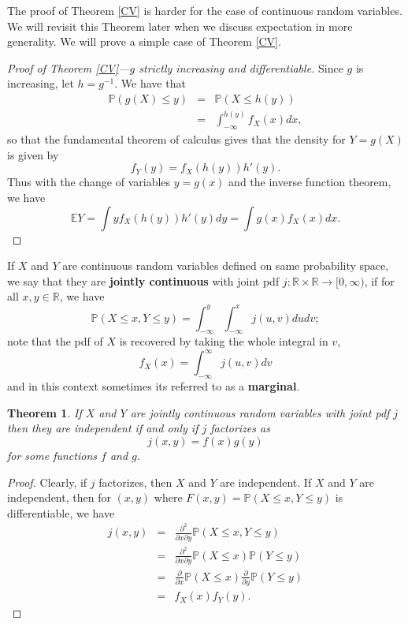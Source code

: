 \documentclass[12pt, reqno]{amsart}
\newtheorem{theorem}{Theorem}
\newcommand\dff[1]{\textbf{#1}}
\renewcommand{\P}{{\mathbb P}}  %
\newcommand{\R}{{\mathbb R}}
\newcommand{\E}{{\mathbb E}}     %
\begin{document}
The proof of Theorem \ref{CV} is harder for the case of continuous random variables.   We will revisit this Theorem later when we discuss expectation in more generality.   We will prove a simple case of Theorem \ref{CV}.

\begin{proof}[Proof of Theorem \ref{CV}---$g$ strictly increasing and differentiable]
Since $g$ is increasing, let $h = g^{-1}$. We have that 
\begin{eqnarray*}
 \P( g(X) \leq y)  &=&  \P( X \leq h(y)) \\
 &=&  \int_{- \infty} ^{h(y)} f_X(x) dx,
\end{eqnarray*}
so that the fundamental theorem of calculus gives that the density for $Y = g(X)$ is given by
$$f_Y(y) = f_X(h(y)) h'(y).$$  Thus with the change of variables $y = g(x)$ and the inverse function theorem, we have 
$$ \E Y = \int y f_X(h(y)) h'(y) dy = \int g(x) f_X(x) dx.$$
\end{proof}


If $X$ and $Y$ are continuous  random variables defined on same probability space, we say that they are \dff{jointly continuous} with joint pdf $j:\R \times \R \to [0, \infty)$, if for all $x,y \in \R$, we have
$$ \P(X \leq x , Y \leq y) = \int_{-\infty} ^y \int_{-\infty} ^x j(u,v) du dv;$$
note that the pdf of $X$ is recovered by taking the whole integral in $v$,
$$f_X(x) =   \int_{-\infty} ^{\infty}  j(u,v) dv$$
and in this context sometimes its referred to as a \dff{marginal}.

\begin{theorem}     If $X$ and $Y$ are jointly continuous random variables with joint pdf $j$ then they are independent if and only if $j$ factorizes as
$$j(x,y) =f(x)g(y)$$
for some functions $f$ and $g$.  

\end{theorem}

\begin{proof}
Clearly, if $j$ factorizes, then $X$ and $Y$ are independent.  If $X$ and $Y$ are independent, then for $(x,y)$ where  $F(x,y) = \P(X \leq x, Y\leq y)$ is differentiable, we have
\begin{eqnarray*}
j(x,y) &=&  \frac{\partial^2}{ \partial x \partial y} \P(X \leq x, Y \leq y) \\
&=& \frac{\partial^2}{ \partial x \partial y} \P(X \leq x) \P( Y \leq y) \\
&=& \frac{ \partial }{\partial x} \P(X \leq x) \frac{\partial }{\partial y} \P( Y \leq y) \\
&=& f_X(x) f_Y(y).
\end{eqnarray*}

\end{proof}
\end{document}
